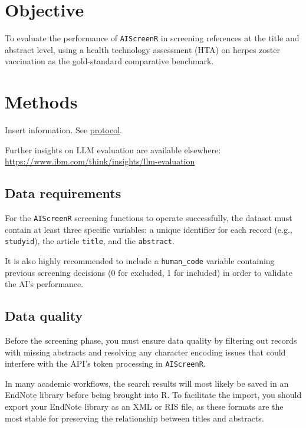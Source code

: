 \documentclass[
  letterpaper,
  DIV=11,
  numbers=noendperiod]{scrartcl}
\begin{document}
\section{Objective}\label{objective}

To evaluate the performance of \texttt{AIScreenR} in screening
references at the title and abstract level, using a health technology
assessment (HTA) on herpes zoster vaccination as the gold-standard
comparative benchmark.\\

\section{Methods}\label{methods}

Insert information. See
\href{https://folkehelse.sharepoint.com/:w:/r/sites/sp000002582/_layouts/15/Doc.aspx?sourcedoc=\%7B1057E2A0-7192-422D-B22E-89E5151100D1\%7D&file=Forskningskart_VVP_prosjektplan_utkast.docx&action=default&mobileredirect=true}{protocol}.

Further insights on LLM evaluation are available elsewhere:
\url{https://www.ibm.com/think/insights/llm-evaluation}

\subsection{Data requirements}\label{data-requirements}

For the \texttt{AIScreenR} screening functions to operate successfully,
the dataset must contain at least three specific variables: a unique
identifier for each record (e.g., \texttt{studyid}), the article
\texttt{title}, and the \texttt{abstract}.

It is also highly recommended to include a \texttt{human\_code} variable
containing previous screening decisions (0 for excluded, 1 for included)
in order to validate the AI's performance.

\subsection{Data quality}\label{data-quality}

Before the screening phase, you must ensure data quality by filtering
out records with missing abstracts and resolving any character encoding
issues that could interfere with the API's token processing in
\texttt{AIScreenR}.

In many academic workflows, the search results will most likely be saved
in an EndNote library before being brought into R. To facilitate the
import, you should export your EndNote library as an XML or RIS file, as
these formats are the most stable for preserving the relationship
between titles and abstracts.
\end{document}
